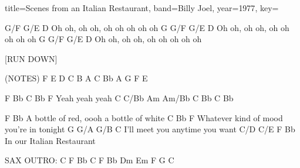 \documentclass{skrul-leadsheet}
\begin{document}
\begin{song}[transpose-capo=true]{title={Scenes from an Italian Restaurant}, band={Billy Joel}, year={1977}, key={}}
 
   G/F    G/E    D
Oh oh, oh oh, oh oh oh oh oh
G  G/F    G/E    D
Oh oh, oh oh, oh oh oh oh oh
G  G/F    G/E    D
Oh oh, oh oh, oh oh oh oh oh
 
 
[RUN DOWN]
 
 (NOTES)            F E D C B A
                    C Bb A G F E
 
 
F  Bb        C   Bb F
   Yeah yeah yeah
C C/Bb Am Am/Bb C  Bb C  Bb
 
 
F                Bb
A bottle of red, oooh a bottle of white
C                            Bb   F
Whatever kind of mood you're in tonight
G             G/A     G/B C
I'll meet you anytime you want
        C/D C/E  F       Bb
In our Italian Restaurant
 
SAX OUTRO:  C  F  Bb  C  F  Bb
            Dm  Em  F  G  C
            
\end{song}
\end{document}
